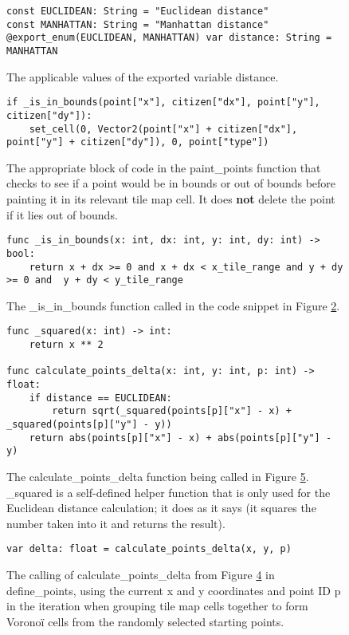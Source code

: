 \begin{figure}[H]
    \centering
    \begin{lstlisting}
const EUCLIDEAN: String = "Euclidean distance"
const MANHATTAN: String = "Manhattan distance"
@export_enum(EUCLIDEAN, MANHATTAN) var distance: String = MANHATTAN
    \end{lstlisting}
    \caption{The applicable values of the exported variable distance.}
    \label{fig:voronoi5}
\end{figure}

\begin{figure}[H]
    \centering
    \begin{lstlisting}
if _is_in_bounds(point["x"], citizen["dx"], point["y"], citizen["dy"]):
    set_cell(0, Vector2(point["x"] + citizen["dx"], point["y"] + citizen["dy"]), 0, point["type"])
    \end{lstlisting}
    \caption{The appropriate block of code in the paint\_points function that checks to see if a point would be in bounds or out of bounds before painting it in its relevant tile map cell. It does \textbf{not} delete the point if it lies out of bounds.}
    \label{fig:voronoi6}
\end{figure}

\begin{figure}[H]
    \centering
    \begin{lstlisting}
func _is_in_bounds(x: int, dx: int, y: int, dy: int) -> bool:
	return x + dx >= 0 and x + dx < x_tile_range and y + dy >= 0 and  y + dy < y_tile_range
    \end{lstlisting}
    \caption{The \_is\_in\_bounds function called in the code snippet in Figure \ref{fig:voronoi6}.}
    \label{fig:voronoi7}
\end{figure}

\begin{figure}[H]
    \centering
    \begin{lstlisting}
func _squared(x: int) -> int:
	return x ** 2

func calculate_points_delta(x: int, y: int, p: int) -> float:
	if distance == EUCLIDEAN:
		return sqrt(_squared(points[p]["x"] - x) + _squared(points[p]["y"] - y))
	return abs(points[p]["x"] - x) + abs(points[p]["y"] - y)
    \end{lstlisting}
    \caption{The calculate\_points\_delta function being called in Figure \ref{fig:voronoi9}. \_squared is a self-defined helper function that is only used for the Euclidean distance calculation; it does as it says (it squares the number taken into it and returns the result).}
    \label{fig:voronoi8}
\end{figure}

\begin{figure}
    \centering
    \begin{lstlisting}
var delta: float = calculate_points_delta(x, y, p)
    \end{lstlisting}
    \caption{The calling of calculate\_points\_delta from Figure \ref{fig:voronoi8} in define\_points, using the current x and y coordinates and point ID p in the iteration when grouping tile map cells together to form Voronoï cells from the randomly selected starting points.}
    \label{fig:voronoi9}
\end{figure}
